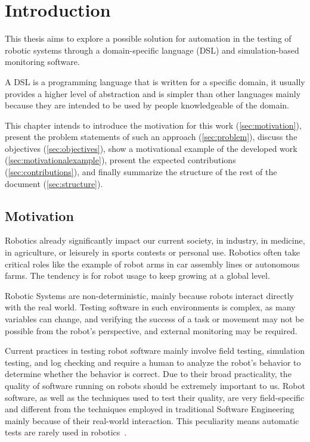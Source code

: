 \chapter{Introduction}
\label{chap:introduction}

This thesis aims to explore a possible solution for automation in the testing of robotic systems through a domain-specific language (DSL) and simulation-based monitoring software.

A DSL is a programming language that is written for a specific domain, it usually provides a higher level of abstraction and is simpler than other languages mainly because they are intended to be used by people knowledgeable of the domain.

This chapter intends to introduce the motivation for this work (\autoref{sec:motivation}), present the problem statements of such an approach (\autoref{sec:problem}), discuss the objectives (\autoref{sec:objectives}), show a motivational example of the developed work (\autoref{sec:motivationalexample}), present the expected contributions (\autoref{sec:contributions}), and finally summarize the structure of the rest of the document (\autoref{sec:structure}).


\section{Motivation}
\label{sec:motivation}

Robotics already significantly impact our current society, in industry, in medicine, in agriculture, or leisurely in sports contests or personal use. Robotics often take critical roles like the example of robot arms in car assembly lines or autonomous farms. The tendency is for robot usage to keep growing at a global level. 

Robotic Systems are non-deterministic, mainly because robots interact directly with the real world. Testing software in such environments is complex, as many variables can change, and verifying the success of a task or movement may not be possible from the robot's perspective, and external monitoring may be required.

Current practices in testing robot software mainly involve field testing, simulation testing, and log checking and require a human to analyze the robot's behavior to determine whether the behavior is correct. Due to their broad practicality, the quality of software running on robots should be extremely important to us. Robot software, as well as the techniques used to test their quality, are very field-specific and different from the techniques employed in traditional Software Engineering mainly because of their real-world interaction. This peculiarity means automatic tests are rarely used in robotics~\cite{9240632,zizyte2021importance}.

